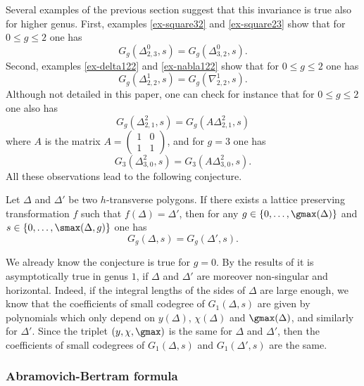 Several examples of the previous section suggest that this invariance is true also for higher genus. 
First, examples \ref{ex-square32} and \ref{ex-square23} show that for $0\leqslant g \leqslant 2$ one has
\[ G_g(\Delta^0_{2,3},s) = G_g(\Delta^0_{3,2},s) .\]
Second, examples \ref{ex-delta122} and \ref{ex-nabla122} show that for $0\leqslant g \leqslant 2$ one has
\[ G_g(\Delta^1_{2,2},s) = G_g(\nabla^1_{2,2},s) .\]
Although not detailed in this paper, one can check for instance that for $0\leqslant g \leqslant 2$ one also has
\[ G_g(\Delta^2_{2,1},s) = G_g(A\Delta^2_{2,1},s) \]
where $A$ is the matrix $A = \begin{pmatrix} 1 & 0 \\ 1 & 1 \end{pmatrix}$, and for $g=3$ one has
\[ G_3(\Delta^2_{3,0},s) = G_3(A\Delta^2_{3,0},s) . \]
All these observations lead to the following conjecture.

\begin{conj}
    Let $\Delta$ and $\Delta'$ be two $h$-transverse polygons. If there exists a lattice preserving transformation $f$ such that $f(\Delta) = \Delta'$, then for any $g\in \{0,\dots,\gmax(\Delta)\}$ and $s\in\{0,\dots,\smax(\Delta,g)\}$ one has
    \[ G_g(\Delta,s) = G_g(\Delta',s) .\]
\end{conj}

We already know the conjecture is true for $g=0$. 
By the results of \cite{blomme-2025-asymptotic} it is asymptotically true in genus $1$, if $\Delta$ and $\Delta'$ are moreover non-singular and horizontal. Indeed, if the integral lengths of the sides of $\Delta$ are large enough, we know that the coefficients of small codegree of $G_1(\Delta,s)$ are given by polynomials which only depend on $y(\Delta)$, $\chi(\Delta)$ and $\gmax(\Delta)$, and similarly for $\Delta'$. Since the triplet $(y,\chi,\gmax)$ is the same for $\Delta$ and $\Delta'$, then the coefficients of small codegrees of $G_1(\Delta,s)$ and $G_1(\Delta',s)$ are the same.

\subsubsection{Abramovich-Bertram formula}

